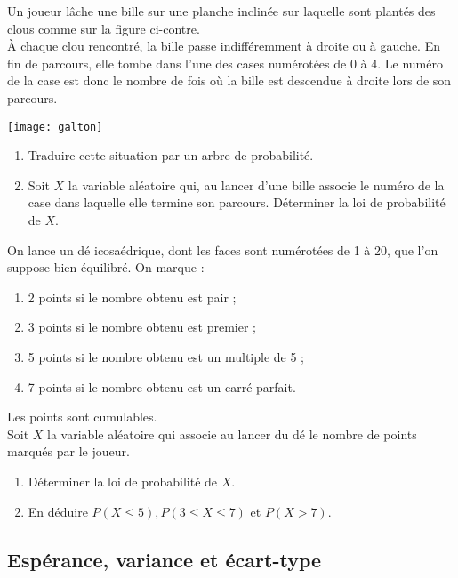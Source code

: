 \documentclass[a4paper,11pt,exos]{nsi} %
\begin{document}
\begin{minipage}{10.9cm}
	Un joueur lâche une bille sur une planche inclinée sur laquelle sont plantés des clous comme sur la figure ci-contre.\\
	À chaque clou rencontré, la bille passe indifféremment à droite ou à gauche. En fin de parcours, elle tombe dans l'une des cases numérotées de 0 à 4. Le numéro de la case est donc le nombre de fois où la bille est descendue à droite lors de son parcours.
\end{minipage}
\begin{minipage}{6.5cm}
	\flushright\texttt{[image: galton]}
\end{minipage}
\begin{enumerate}
	\item 	Traduire cette situation par un arbre de probabilité.
	\item 	Soit $X$ la variable aléatoire qui, au lancer d'une bille associe le numéro de la case dans laquelle elle termine son parcours. Déterminer la loi de probabilité de $X$.
\end{enumerate}

\exo{}
On lance un dé icosaédrique, dont les faces sont numérotées de 1 à 20, que l'on suppose bien équilibré. On marque :

	\begin{enumerate}[label=\textbullet]
		\item 	2 points si le nombre obtenu est pair ;
		\item 	3 points si le nombre obtenu est premier ;
		\item	5 points si le nombre obtenu est un multiple de 5 ;
		\item	7 points si le nombre obtenu est un carré parfait.	
	\end{enumerate}
Les points sont cumulables.\\
Soit $X$ la variable aléatoire qui associe au lancer du dé le nombre de points marqués par le joueur.
\begin{enumerate}
	\item 	Déterminer la loi de probabilité de $X$.
	\item 	En déduire $P(X\leqslant 5), P(3\leqslant X \leqslant7)$ et $P(X>7)$.	
\end{enumerate}

\subsection*{Espérance, variance et écart-type}
\end{document}
